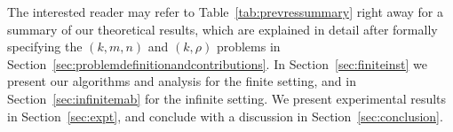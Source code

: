 
The interested reader may refer to Table~\ref{tab:prevressummary} right away for a summary of our theoretical results, which are explained in detail after formally specifying the $(k, m, n)$ and $(k, \rho)$ problems in Section~\ref{sec:problemdefinitionandcontributions}. In Section~\ref{sec:finiteinst} we present our algorithms and analysis for the finite setting, and in Section~\ref{sec:infinitemab} for the infinite setting. We present experimental results in Section~\ref{sec:expt}, and conclude with a discussion in Section~\ref{sec:conclusion}.

